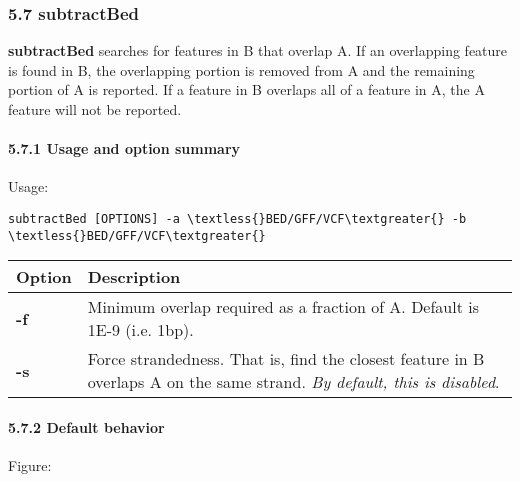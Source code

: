 \documentclass[letterpaper,10pt,english]{sphinxmanual}
\begin{document}
\subsubsection{5.7 subtractBed}
\label{content/subtractBed:subtractbed}\label{content/subtractBed::doc}
\textbf{subtractBed} searches for features in B that overlap A. If an overlapping feature is found in B, the
overlapping portion is removed from A and the remaining portion of A is reported. If a feature in B
overlaps all of a feature in A, the A feature will not be reported.


\paragraph{5.7.1 Usage and option summary}
\label{content/subtractBed:usage-and-option-summary}
Usage:

\begin{Verbatim}[commandchars=\\\{\}]
subtractBed [OPTIONS] -a \textless{}BED/GFF/VCF\textgreater{} -b \textless{}BED/GFF/VCF\textgreater{}
\end{Verbatim}

\begin{tabulary}{\linewidth}{|L|L|}
\hline
\textbf{
Option
} & \textbf{
Description
}\\\hline

\textbf{-f}
 & 
Minimum overlap required as a fraction of A. Default is 1E-9 (i.e. 1bp).
\\\hline

\textbf{-s}
 & 
Force strandedness. That is, find the closest feature in B overlaps A on the same strand.  \emph{By default, this is disabled}.
\\\hline
\end{tabulary}



\paragraph{5.7.2 Default behavior}
\label{content/subtractBed:default-behavior}
Figure:
\end{document}

